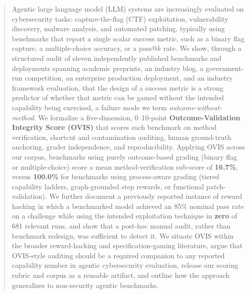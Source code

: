 \documentclass[10pt,twocolumn]{article}
\begin{document}

\begin{abstract}
\noindent
Agentic large language model (LLM) systems are increasingly evaluated on
cybersecurity tasks: capture-the-flag (CTF) exploitation, vulnerability
discovery, malware analysis, and automated patching, typically using
benchmarks that report a single scalar success metric, such as a binary
flag capture, a multiple-choice accuracy, or a pass@$k$ rate. We show,
through a structured audit of eleven independently published benchmarks
and deployments spanning academic preprints, an industry blog, a
government-run competition, an enterprise production deployment, and an
industry framework evaluation, that the design of a success metric is a
strong predictor of whether that metric can be gamed without the
intended capability being exercised, a failure mode we term
\emph{outcome-without-method}. We formalize a five-dimension,
0--10-point \textbf{Outcome-Validation Integrity Score (OVIS)} that
scores each benchmark on method verification, shortcut and contamination
auditing, human ground-truth anchoring, grader independence, and
reproducibility. Applying OVIS across our corpus, benchmarks using
purely outcome-based grading (binary flag or multiple-choice) score a
mean method-verification sub-score of \textbf{16.7\%}, versus
\textbf{100.0\%} for benchmarks using process-aware grading (tiered
capability ladders, graph-grounded step rewards, or functional
patch-validation). We further document a previously reported instance of
reward hacking in which a benchmarked model achieved an 85\% nominal
pass rate on a challenge while using the intended exploitation technique
in \textbf{zero} of 681 relevant runs, and show that a post-hoc manual
audit, rather than benchmark redesign, was sufficient to detect it. We
situate OVIS within the broader reward-hacking and specification-gaming
literature, argue that OVIS-style auditing should be a required
companion to any reported capability number in agentic cybersecurity
evaluation, release our scoring rubric and corpus as a reusable
artifact, and outline how the approach generalizes to non-security
agentic benchmarks.
\end{abstract}
\end{document}
